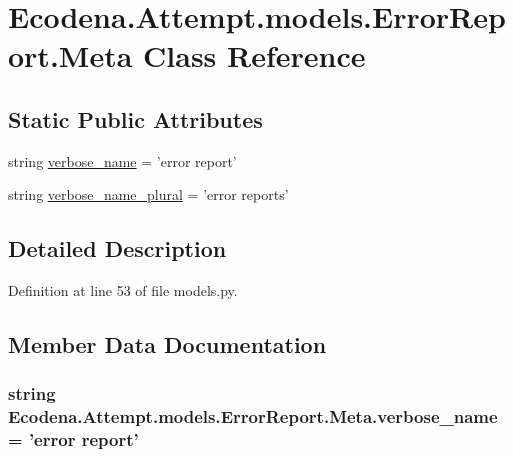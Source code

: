 \hypertarget{class_ecodena_1_1_attempt_1_1models_1_1_error_report_1_1_meta}{
\section{Ecodena.Attempt.models.ErrorReport.Meta Class Reference}
\label{d2/d9e/class_ecodena_1_1_attempt_1_1models_1_1_error_report_1_1_meta}
}
\subsection*{Static Public Attributes}
\begin{DoxyCompactItemize}
\item 
string \hyperlink{class_ecodena_1_1_attempt_1_1models_1_1_error_report_1_1_meta_abb1839b5a65fea4d0a4eaf2449533fd3}{verbose\_\-name} = 'error report'
\item 
string \hyperlink{class_ecodena_1_1_attempt_1_1models_1_1_error_report_1_1_meta_af5a03ae3d989401f2207e282fe47c680}{verbose\_\-name\_\-plural} = 'error reports'
\end{DoxyCompactItemize}


\subsection{Detailed Description}


Definition at line 53 of file models.py.



\subsection{Member Data Documentation}
\hypertarget{class_ecodena_1_1_attempt_1_1models_1_1_error_report_1_1_meta_abb1839b5a65fea4d0a4eaf2449533fd3}{
\subsubsection[{verbose\_\-name}]{\setlength{\rightskip}{0pt plus 5cm}string {\bf Ecodena.Attempt.models.ErrorReport.Meta.verbose\_\-name} = 'error report'}}
\label{d2/d9e/class_ecodena_1_1_attempt_1_1models_1_1_error_report_1_1_meta_abb1839b5a65fea4d0a4eaf2449533fd3}


